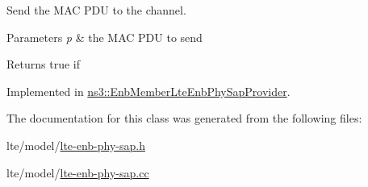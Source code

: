 Send the M\+AC P\+DU to the channel. 


\begin{DoxyParams}{Parameters}
{\em p} & the M\+AC P\+DU to send \\
\hline
\end{DoxyParams}
\begin{DoxyReturn}{Returns}
true if 
\end{DoxyReturn}


Implemented in \hyperlink{classns3_1_1EnbMemberLteEnbPhySapProvider_a6df331066c8b2bd05402340ec5ded518}{ns3\+::\+Enb\+Member\+Lte\+Enb\+Phy\+Sap\+Provider}.



The documentation for this class was generated from the following files\+:\begin{DoxyCompactItemize}
\item 
lte/model/\hyperlink{lte-enb-phy-sap_8h}{lte-\/enb-\/phy-\/sap.\+h}\item 
lte/model/\hyperlink{lte-enb-phy-sap_8cc}{lte-\/enb-\/phy-\/sap.\+cc}\end{DoxyCompactItemize}
